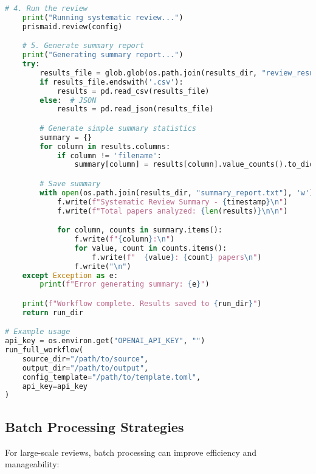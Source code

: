 \begin{commandbox}
\begin{lstlisting}[language=Python]
    # 4. Run the review
    print("Running systematic review...")
    prismaid.review(config)

    # 5. Generate summary report
    print("Generating summary report...")
    try:
        results_file = glob.glob(os.path.join(results_dir, "review_results.*"))[0]
        if results_file.endswith('.csv'):
            results = pd.read_csv(results_file)
        else:  # JSON
            results = pd.read_json(results_file)

        # Generate simple summary statistics
        summary = {}
        for column in results.columns:
            if column != 'filename':
                summary[column] = results[column].value_counts().to_dict()

        # Save summary
        with open(os.path.join(results_dir, "summary_report.txt"), 'w') as f:
            f.write(f"Systematic Review Summary - {timestamp}\n")
            f.write(f"Total papers analyzed: {len(results)}\n\n")

            for column, counts in summary.items():
                f.write(f"{column}:\n")
                for value, count in counts.items():
                    f.write(f"  {value}: {count} papers\n")
                f.write("\n")
    except Exception as e:
        print(f"Error generating summary: {e}")

    print(f"Workflow complete. Results saved to {run_dir}")
    return run_dir

# Example usage
api_key = os.environ.get("OPENAI_API_KEY", "")
run_full_workflow(
    source_dir="/path/to/source",
    output_dir="/path/to/output",
    config_template="/path/to/template.toml",
    api_key=api_key
)
\end{lstlisting}
\end{commandbox}

\subsection{Batch Processing Strategies}

For large-scale reviews, batch processing can improve efficiency and manageability:

